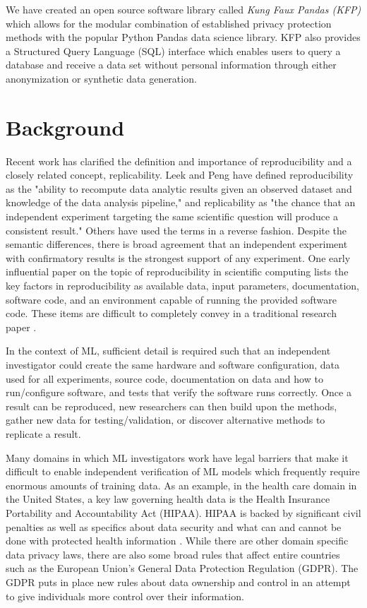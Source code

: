 \documentclass{article}
\begin{document}
We have created an open source software library called \emph{Kung Faux Pandas (KFP)} which allows for the modular combination of established privacy protection methods with the popular Python Pandas data science library\cite{mckinney-proc-scipy-2010}. KFP also provides a Structured Query Language (SQL) interface which enables users to query a database and receive a data set without personal information through either anonymization or synthetic data generation.

\section{Background}

Recent work has clarified the definition and importance of reproducibility and a closely related concept, replicability. Leek and Peng have defined reproducibility as the "ability to recompute data analytic results given an observed dataset and knowledge of the data analysis pipeline," and replicability as "the chance that an independent experiment targeting the same scientific question will produce a consistent result."\cite{leek_opinion_2015,peng_reproducible_2006} Others have used the terms in a reverse fashion\cite{drummond_replicability_2009}. Despite the semantic differences, there is broad agreement that an independent experiment with confirmatory results is the strongest support of any experiment. One early influential paper on the topic of reproducibility in scientific computing lists the key factors in reproducibility as available data, input parameters, documentation, software code, and an environment capable of running the provided software code. These items are difficult to completely convey in a traditional research paper \cite{schwab_making_2000}.

In the context of ML, sufficient detail is required such that an independent investigator could create the same hardware and software configuration, data used for all experiments, source code, documentation on data and how to run/configure software, and tests that verify the software runs correctly. Once a result can be reproduced, new researchers can then build upon the methods, gather new data for testing/validation, or discover alternative methods to replicate a result.

Many domains in which ML investigators work have legal barriers that make it difficult to enable independent verification of ML models which frequently require enormous amounts of training data. As an example, in the health care domain in the United States, a key law governing health data is the Health Insurance Portability and Accountability Act (HIPAA). HIPAA is backed by significant civil penalties as well as specifics about data security and what can and cannot be done with protected health information \cite{hippaviol}. While there are other domain specific data privacy laws, there are also some broad rules that affect entire countries such as the European Union's General Data Protection Regulation (GDPR). The GDPR puts in place new rules about data ownership and control in an attempt to give individuals more control over their information.
\end{document}
